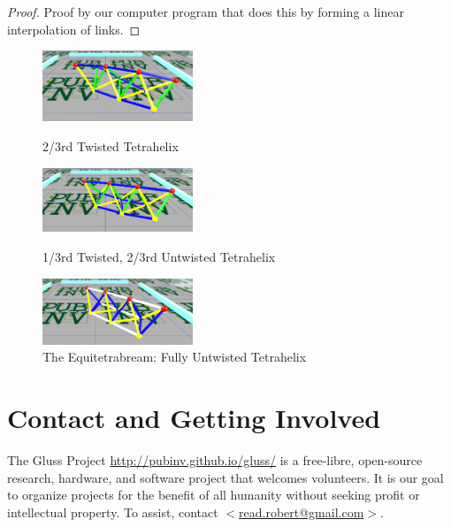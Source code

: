 \documentclass[11pt]{article}
\begin{document}
\begin{proof}
  Proof by our computer program that does this by forming a linear interpolation of links.
\end{proof}

\begin{figure}[H] %
  \centering
     \includegraphics[width=0.4\textwidth]{figures/Tetrahelix1.png}
     \caption{2/3rd Twisted Tetrahelix}
     \includegraphics[width=0.4\textwidth]{figures/Tetrahelix2.png}
     \caption{1/3rd Twisted, 2/3rd Untwisted Tetrahelix}
     \includegraphics[width=0.4\textwidth]{figures/Tetrahelix3.png}
     \caption{The Equitetrabream: Fully Untwisted Tetrahelix}
\end{figure}

\section{Contact and Getting Involved}

The Gluss Project \url{http://pubinv.github.io/gluss/}
is a free-libre, open-source research, hardware, and software project that welcomes volunteers.
It is our goal to organize projects for the benefit of all humanity without seeking profit or intellectual property.
To assist, contact \href{mailto:read.robert@gmail.com}{$<$read.robert@gmail.com$>$}.



\end{document}
